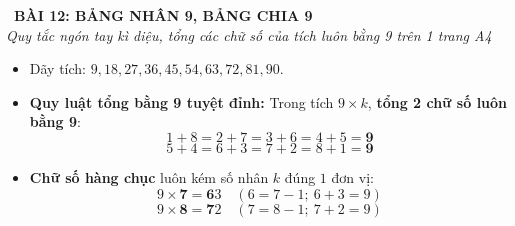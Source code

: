 \documentclass[12pt,a4paper]{article}
\begin{document}
\begin{tcolorbox}[
  enhanced,
  colback=teal!8!white,
  colframe=teal!70!black,
  arc=3mm, boxrule=1.2pt,
  left=3mm, right=3mm, top=2mm, bottom=2mm,
  halign=center
]
  {\LARGE\bfseries\color{teal!90!black}\faBookmark\ BÀI 12: BẢNG NHÂN 9, BẢNG CHIA 9}\\[1mm]
  {\itshape\footnotesize\color{black!75} Quy tắc ngón tay kì diệu, tổng các chữ số của tích luôn bằng 9 trên 1 trang A4}
\end{tcolorbox}

\vspace{-2mm}

\noindent
\begin{minipage}[t]{0.49\textwidth}\vspace{0pt}
\begin{tcolorbox}[
  enhanced,
  colback=blue!4!white,
  colframe=blue!75!black,
  arc=2mm, boxrule=0.8pt,
  left=2mm, right=2mm, top=1.8mm, bottom=1.8mm,
  title={\footnotesize\bfseries\color{white}\faTimes\ 1. Bảng nhân 9 (Ảo thuật số học)}
]
{\footnotesize
\begin{itemize}\setlength{\itemsep}{0.6pt}\setlength{\leftskip}{-2.5mm}
  \item Dãy tích: $9, 18, 27, 36, 45, 54, 63, 72, 81, 90$.
  \item \textbf{Quy luật tổng bằng 9 tuyệt đỉnh:}
  Trong tích $9 \times k$, \textbf{tổng 2 chữ số luôn bằng 9}:
  $$1+8 = 2+7 = 3+6 = 4+5 = \mathbf{9}$$
  $$5+4 = 6+3 = 7+2 = 8+1 = \mathbf{9}$$
  \item \textbf{Chữ số hàng chục} luôn kém số nhân $k$ đúng $1$ đơn vị:
  $$9 \times \mathbf{7} = \mathbf{6}3\quad (6 = 7 - 1;\ 6 + 3 = 9)$$
  $$9 \times \mathbf{8} = \mathbf{7}2\quad (7 = 8 - 1;\ 7 + 2 = 9)$$
\end{itemize}
}
\end{tcolorbox}
\end{minipage}
\hfill
\end{document}
